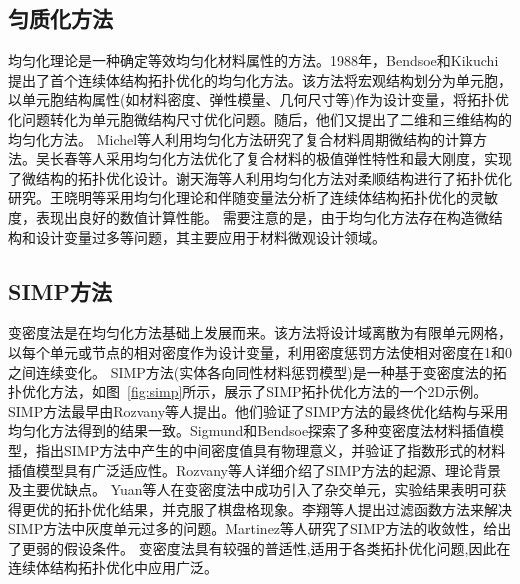 \subsection{匀质化方法}
均匀化理论是一种确定等效均匀化材料属性的方法。1988年，Bendsoe和Kikuchi提出了首个连续体结构拓扑优化的均匀化方法\cite{BENDSOE1988}。该方法将宏观结构划分为单元胞，以单元胞结构属性(如材料密度、弹性模量、几何尺寸等)作为设计变量，将拓扑优化问题转化为单元胞微结构尺寸优化问题。随后，他们又提出了二维和三维结构的均匀化方法\cite{GUEDES1990}。
Michel等人利用均匀化方法研究了复合材料周期微结构的计算方法\cite{MICHEL1999}。吴长春等人采用均匀化方法优化了复合材料的极值弹性特性和最大刚度，实现了微结构的拓扑优化设计\cite{Yuan2003}。谢天海等人利用均匀化方法对柔顺结构进行了拓扑优化研究\cite{Xie2003}。王晓明等采用均匀化理论和伴随变量法分析了连续体结构拓扑优化的灵敏度，表现出良好的数值计算性能\cite{Wang1999}。
需要注意的是，由于均匀化方法存在构造微结构和设计变量过多等问题，其主要应用于材料微观设计领域。
\subsection{SIMP方法}
变密度法是在均匀化方法基础上发展而来。该方法将设计域离散为有限单元网格，以每个单元或节点的相对密度作为设计变量，利用密度惩罚方法使相对密度在1和0之间连续变化。
SIMP方法(实体各向同性材料惩罚模型)是一种基于变密度法的拓扑优化方法，如图~\ref{fig:simp}所示，展示了SIMP拓扑优化方法的一个2D示例。SIMP方法最早由Rozvany等人提出\cite{Rozvany1992}。他们验证了SIMP方法的最终优化结构与采用均匀化方法得到的结果一致。Sigmund和Bendsoe探索了多种变密度法材料插值模型\cite{Bendsoe2003,Bendsoe1999}，指出SIMP方法中产生的中间密度值具有物理意义，并验证了指数形式的材料插值模型具有广泛适应性。Rozvany等人详细介绍了SIMP方法的起源、理论背景及主要优缺点\cite{Rozvany2001}。
Yuan等人在变密度法中成功引入了杂交单元，实验结果表明可获得更优的拓扑优化结果，并克服了棋盘格现象\cite{Yuan2001}。李翔等人提出过滤函数方法来解决SIMP方法中灰度单元过多的问题。Martinez等人研究了SIMP方法的收敛性，给出了更弱的假设条件\cite{Martinez2005}。
变密度法具有较强的普适性,适用于各类拓扑优化问题,因此在连续体结构拓扑优化中应用广泛。


